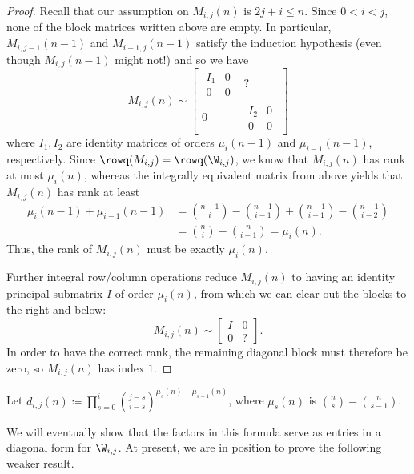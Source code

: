 \begin{proof}
Recall that our assumption on $M_{i,j}(n)$ is $2j+i \leq n$.  Since $0<i<j$, none of the block matrices written above are empty.  In particular, $M_{i,j-1}(n-1)$ and $M_{i-1,j}(n-1)$ satisfy the induction hypothesis (even though $M_{i,j}(n-1)$ might not!) and so we have 
\[
M_{i,j}(n) \sim \left [ \begin{array}{c|c}
\begin{array}{c|c}
I_1 & 0 \\
\hline
0 & 0
\end{array} & 
? \\
\hline
0 & \begin{array}{c|c}
I_2 & 0 \\
\hline
0 & 0
\end{array}
\end{array} \right ]
\]
where $I_1, I_2$ are identity matrices of orders $\mu_{i}(n-1)$ and $\mu_{i-1}(n-1)$, respectively.  Since $\rowq(M_{i,j}) = \rowq(\W_{i,j})$, we know that $M_{i,j}(n)$ has rank at most $\mu_{i}(n)$, whereas the integrally equivalent matrix from above yields that $M_{i,j}(n)$ has rank at least 
\begin{align*}
\mu_{i}(n-1) + \mu_{i-1}(n-1) &=  \binom{n-1}{i} - \binom{n-1}{i-1} + \binom{n-1}{i-1} - \binom{n-1}{i-2} \\
&= \binom{n}{i} - \binom{n}{i-1} = \mu_{i}(n).
\end{align*}
Thus, the rank of $M_{i,j}(n)$ must be exactly $\mu_{i}(n)$.  

Further integral row/column operations reduce $M_{i,j}(n)$ to having an identity principal submatrix $I$ of order $\mu_{i}(n)$, from which we can clear out the blocks to the right and below:
\[ M_{i,j}(n) \sim \left [ \begin{array}{c|c}
I & 0 \\
\hline
0 & ?
\end{array} \right ]. \] 
In order to have the correct rank, the remaining diagonal block must therefore be zero, so $M_{i,j}(n)$ has index $1$.
\end{proof}



\begin{definition}
Let $d_{i,j}(n) \coloneqq  \prod_{s=0}^{i} \binom{j-s}{i-s}^{\mu_{s}(n) - \mu_{s-1}(n)}$, where $\mu_{s}(n)$ is \mbox{$\binom{n}{s} - \binom{n}{s-1}$}.
\end{definition}

We will eventually show that the factors in this formula serve as entries in a diagonal form for $\W_{i,j}$.  At present, we are in position to prove the following weaker result.

